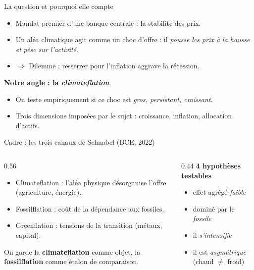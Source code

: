 \documentclass[11pt,aspectratio=169]{beamer}
\begin{document}
\begin{frame}{La question et pourquoi elle compte}
\begin{itemize}
\item Mandat premier d'une banque centrale : la \alert{stabilité des prix}.
\item Un aléa climatique agit comme un \alert{choc d'offre} : il \emph{pousse les prix à la hausse} \emph{et} \emph{pèse sur l'activité}.
\item $\Rightarrow$ Dilemme : resserrer pour l'inflation aggrave la récession.
\end{itemize}
\vfill
\textbf{\color{dauphblue}Notre angle : la \emph{climateflation}}
\begin{itemize}
\item On teste empiriquement si ce choc est \emph{gros, persistant, croissant}.
\item Trois dimensions imposées par le sujet : \alert{croissance}, \alert{inflation}, \alert{allocation d'actifs}.
\end{itemize}
\end{frame}

\begin{frame}{Cadre : les trois canaux de Schnabel (BCE, 2022)}
\begin{columns}[T]
\begin{column}{0.56\textwidth}
\begin{itemize}
\item \alert{Climateflation} : l'aléa physique désorganise l'offre (agriculture, énergie).
\item \alert{Fossilflation} : coût de la dépendance aux fossiles.
\item \alert{Greenflation} : tensions de la transition (métaux, capital).
\end{itemize}
\vspace{0.5em}
On garde la \textbf{climateflation} comme objet, la \textbf{fossilflation} comme étalon de comparaison.
\end{column}
\begin{column}{0.44\textwidth}
\small\textbf{\color{dauphblue}4 hypothèses testables}
\begin{itemize}\small
\item[H1] effet agrégé \emph{faible}
\item[H2] dominé par le \emph{fossile}
\item[H3] il \emph{s'intensifie}
\item[H4] il est \emph{asymétrique} (chaud $\neq$ froid)
\end{itemize}
\end{column}
\end{columns}
\end{frame}
\end{document}
